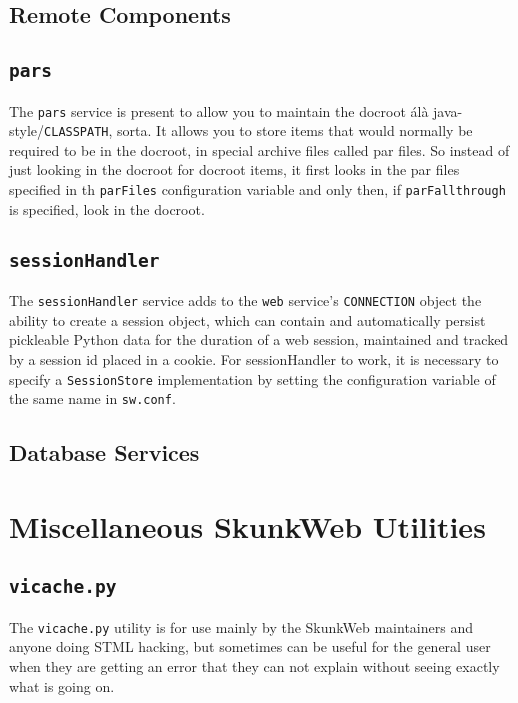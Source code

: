 \documentclass[titlepage]{manual}
\begin{document}
\section{Remote Components}
\label{remotecomponents}


\section{\texttt{pars}}

The \texttt{pars} service is present to allow you to maintain the
docroot \'al\`a java-style/\texttt{CLASSPATH}, sorta.  It allows you
to store items that would normally be required to be in the docroot,
in special archive files called par files.  So instead of just looking
in the docroot for docroot items, it first looks in the par files
specified in th \texttt{parFiles} configuration variable and only
then, if \texttt{parFallthrough} is specified, look in the docroot.

\section{\texttt{sessionHandler}}
The \texttt{sessionHandler} service adds to the \texttt{web}
service's \texttt{CONNECTION} object the ability to create a session object,
which can contain and automatically persist pickleable Python data for the 
duration of a web session, maintained and tracked by a session id placed 
in a cookie.  For sessionHandler to work, it is necessary to specify a 
\texttt{SessionStore} implementation by setting the configuration variable of
the same name in \texttt{sw.conf}.

\section{Database Services}
\label{databaseservices}

\chapter{Miscellaneous SkunkWeb Utilities}
\section{\texttt{vicache.py}}
The \texttt{vicache.py} utility is for use mainly by the SkunkWeb maintainers
and anyone doing STML hacking, but sometimes can be useful for the general
user when they are getting an error that they can not explain without
seeing exactly what is going on.
\end{document}
